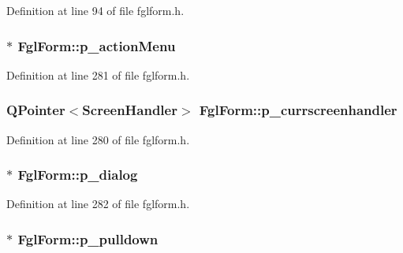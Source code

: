 Definition at line 94 of file fglform.h.

\hypertarget{classFglForm_aace1d4f7b637af4d3aa86e53a770152e}{
\subsubsection[{p\_\-actionMenu}]{$\ast$ {\bf FglForm::p\_\-actionMenu}}}
\label{classFglForm_aace1d4f7b637af4d3aa86e53a770152e}


Definition at line 281 of file fglform.h.

\hypertarget{classFglForm_a98e11b2d55100f907821e3a8281b4ab5}{
\subsubsection[{p\_\-currscreenhandler}]{\setlength{\rightskip}{0pt plus 5cm}QPointer$<$ScreenHandler$>$ {\bf FglForm::p\_\-currscreenhandler}}}
\label{classFglForm_a98e11b2d55100f907821e3a8281b4ab5}


Definition at line 280 of file fglform.h.

\hypertarget{classFglForm_afa28d86c6e353e3e31c677b463199a4a}{
\subsubsection[{p\_\-dialog}]{$\ast$ {\bf FglForm::p\_\-dialog}}}
\label{classFglForm_afa28d86c6e353e3e31c677b463199a4a}


Definition at line 282 of file fglform.h.

\hypertarget{classFglForm_a87a0ac69973f45c48fb629d04ac5b364}{
\subsubsection[{p\_\-pulldown}]{$\ast$ {\bf FglForm::p\_\-pulldown}}}
\label{classFglForm_a87a0ac69973f45c48fb629d04ac5b364}


